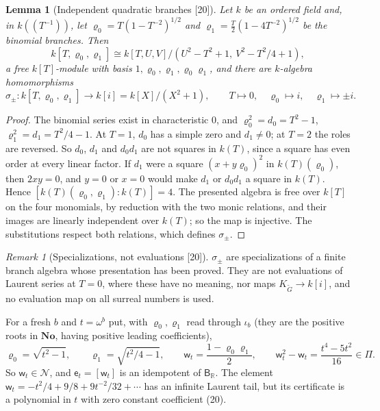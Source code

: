 \documentclass[11pt,letterpaper]{article}
\numberwithin{equation}{section}
\newtheorem{lemma}[lemma]{Lemma}
\theoremstyle{definition}
\theoremstyle{remark}
\newtheorem{remark}[remark]{Remark}
\theoremstyle{plain}
\newcommand{\No}{\mathbf{No}}
\newcommand{\R}{\mathbb R}
\newcommand{\NN}{\mathcal N}         %
\newcommand{\src}[1]{\textup{\textsf{[#1]}}}
\begin{document}
\begin{lemma}[Independent quadratic branches \src{20}]\label{osq:bb:lem:quadratic}
Let $k$ be an ordered field and, in $k(\!(T^{-1})\!)$, let $\varrho_0=T(1-T^{-2})^{1/2}$ and $\varrho_1=\frac T2(1-4T^{-2})^{1/2}$ be the
binomial branches. Then
\[
 k[T,\varrho_0,\varrho_1]\cong k[T,U,V]/(U^2-T^2+1,\ V^2-T^2/4+1),
\]
a free $k[T]$-module with basis $1,\varrho_0,\varrho_1,\varrho_0\varrho_1$, and there are $k$-algebra homomorphisms
\[
 \sigma_\pm:k[T,\varrho_0,\varrho_1]\to k[i]=k[X]/(X^2+1),\qquad T\mapsto0,\quad\varrho_0\mapsto i,\quad\varrho_1\mapsto\pm i .
\]
\end{lemma}
\begin{proof}
The binomial series exist in characteristic $0$, and $\varrho_0^2=d_0=T^2-1$, $\varrho_1^2=d_1=T^2/4-1$. At $T=1$, $d_0$ has a simple
zero and $d_1\ne0$; at $T=2$ the roles are reversed. So $d_0$, $d_1$ and $d_0d_1$ are not squares in $k(T)$, since a square has
even order at every linear factor. If $d_1$ were a square $(x+y\varrho_0)^2$ in $k(T)(\varrho_0)$, then $2xy=0$, and $y=0$ or $x=0$
would make $d_1$ or $d_0d_1$ a square in $k(T)$. Hence $[k(T)(\varrho_0,\varrho_1):k(T)]=4$. The presented algebra is free over
$k[T]$ on the four monomials, by reduction with the two monic relations, and their images are linearly independent over $k(T)$; so
the map is injective. The substitutions respect both relations, which defines $\sigma_\pm$.
\end{proof}

\begin{remark}[Specializations, not evaluations \src{20}]\label{osq:bb:rem:specialization}
$\sigma_\pm$ are specializations of a finite branch algebra whose presentation has been proved. They are not evaluations of Laurent
series at $T=0$, where these have no meaning, nor maps $K_{\widetilde G}\to k[i]$, and no evaluation map on all surreal numbers is
used.
\end{remark}

For a fresh $b$ and $t=\omega^b$ put, with $\varrho_0,\varrho_1$ read through $\iota_b$ (they are the positive roots in $\No$, having
positive leading coefficients),
\begin{equation}\label{osq:bb:eq:splitter}
 \varrho_0=\sqrt{t^2-1},\qquad \varrho_1=\sqrt{t^2/4-1},\qquad \mathsf w_t=\frac{1-\varrho_0\varrho_1}2,\qquad
 \mathsf w_t^2-\mathsf w_t=\frac{t^4-5t^2}{16}\in\Pi .
\end{equation}
So $\mathsf w_t\in\NN$, and $\mathsf e_t=[\mathsf w_t]$ is an idempotent of $\mathsf B_\R$. The element $\mathsf w_t=-t^2/4+9/8+9t^{-2}/32+\cdots$
has an infinite Laurent tail, but its certificate is a polynomial in $t$ with zero constant coefficient (20).
\end{document}
